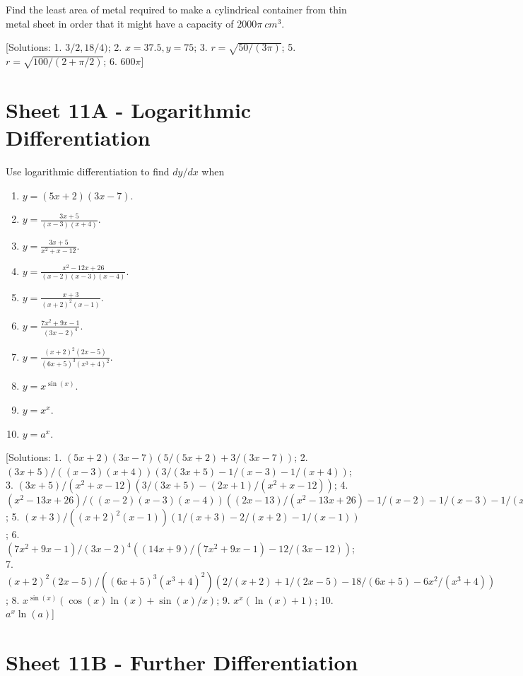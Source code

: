 \documentclass[
  11pt,
  oneside]{book}
\providecommand{\tightlist}{%
  \setlength{\itemsep}{0pt}\setlength{\parskip}{0pt}}
\newcommand{\slide}{}
\theoremstyle{definition}
\theoremstyle{definition}
\theoremstyle{definition}
\theoremstyle{definition}
\theoremstyle{remark}
\begin{document}
Find the least area of metal required to make a cylindrical container from thin metal sheet in order that it might have a capacity of \(2000\pi\ cm^3\).

{[}Solutions: 1. \(3/2,18/4)\); 2. \(x=37.5, y = 75\); 3. \(r=\sqrt{50/(3\pi)}\); 5. \(r=\sqrt{100/(2+\pi/2)}\); 6. \(600\pi\){]}
\slide

\section{Sheet 11A - Logarithmic Differentiation}\label{sheet-11a---logarithmic-differentiation}

Use logarithmic differentiation to find \(dy/dx\) when

\begin{enumerate}
\def\labelenumi{\arabic{enumi}.}
\tightlist
\item
  \(y = (5x+2)(3x-7)\).
\item
  \(y = \frac{3x+5}{(x-3)(x+4)}\).
\item
  \(y = \frac{3x+5}{x^2+x-12}\).
\item
  \(y = \frac{x^2-12x+26}{(x-2)(x-3)(x-4)}\).
\item
  \(y = \frac{x+3}{(x+2)^2(x-1)}\).
\item
  \(y = \frac{7x^2+9x-1}{(3x-2)^4}\).
\item
  \(y = \frac{(x+2)^2(2x-5)}{(6x+5)^3(x^3+4)^2}\).
\item
  \(y = x^{\sin(x)}\).
\item
  \(y = x^x\).
\item
  \(y = a^x\).
\end{enumerate}

{[}Solutions: 1. \((5x+2)(3x-7)\left(5/(5x+2)+3/(3x-7)\right)\); 2. \((3x+5)/((x-3)(x+4))\left(3/(3x+5)-1/(x-3)-1/(x+4)\right)\); 3. \((3x+5)/(x^2+x-12)\left(3/(3x+5)-(2x+1)/(x^2+x-12)\right)\); 4. \((x^2-13x+26)/((x-2)(x-3)(x-4))\left((2x-13)/(x^2-13x+26)-1/(x-2)-1/(x-3)-1/(x-4)\right)\); 5. \((x+3)/((x+2)^2(x-1))\left(1/(x+3)-2/(x+2)-1/(x-1)\right)\); 6. \((7x^2+9x-1)/(3x-2)^4\left((14x+9)/(7x^2+9x-1)-12/(3x-12)\right)\); 7. \((x+2)^2(2x-5)/((6x+5)^3(x^3+4)^2)\left(2/(x+2)+1/(2x-5)-18/(6x+5)-6x^2/(x^3+4)\right)\); 8. \(x^{\sin(x)}\left(\cos(x)\ln(x)+\sin(x)/x\right)\); 9. \(x^x(\ln(x)+1)\); 10. \(a^x\ln(a)\){]}

\section{Sheet 11B - Further Differentiation}\label{sheet-11b---further-differentiation}
\end{document}
